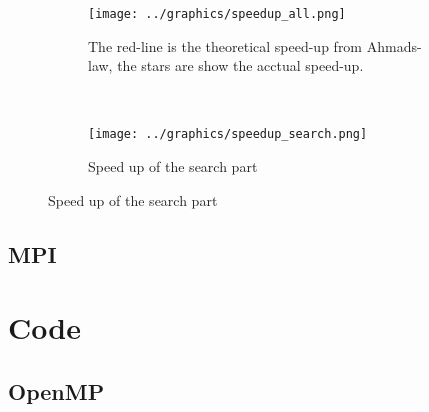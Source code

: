 \documentclass[a4paper,10pt]{article}
\begin{document}
\begin{figure}
        \centering
        \begin{subfigure}[b]{0.6\textwidth}
                \centering
                \texttt{[image: ../graphics/speedup\_all.png]}
                \caption{The red-line is the theoretical speed-up from Ahmads-law, the stars are
                         show the acctual speed-up.}
                \label{fig:gull}
        \end{subfigure}%
        \\ %
        \begin{subfigure}[b]{0.6\textwidth}
                \centering
                \texttt{[image: ../graphics/speedup\_search.png]}
                \caption{Speed up of the search part}
                \label{fig:tiger}
        \end{subfigure}
\end{figure}


\subsection{MPI}

\appendix
\section{Code}
%    
  \subsection{OpenMP}
       
\end{document}
